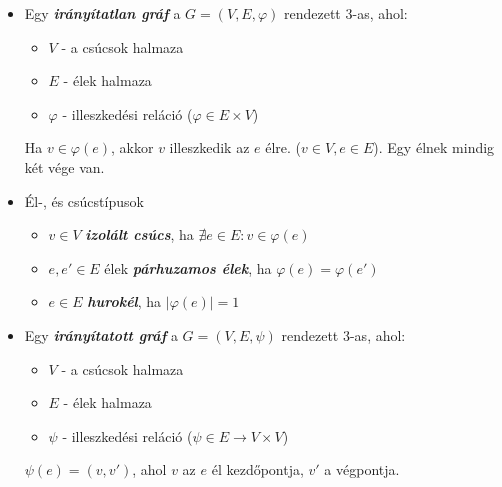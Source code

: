 \documentclass[12pt,margin=0px]{article}
\begin{document}
	\begin{itemize}[leftmargin=5.5mm]
        \renewcommand{\labelitemi}{$\vcenter{\hbox{\tiny$\bullet$}}$}
		\item Egy \emph{\textbf{irányítatlan gráf}} a $G = (V,E, \varphi)$ rendezett 3-as, ahol:
        \begin{itemize}[leftmargin=5.5mm]
            \renewcommand{\labelitemii}{$\vcenter{\hbox{\tiny$\triangleright$}}$}
            \item $V$ - a csúcsok halmaza
            \item $E$ - élek halmaza
            \item $\varphi$ - illeszkedési reláció ($\varphi \in E \times V$)
        \end{itemize}

        Ha $v\in\varphi(e)$, akkor $v$ illeszkedik az $e$ élre. ($v\in V, e\in E$). Egy élnek mindig két vége van.

        \item Él-, és csúcstípusok
        \begin{itemize}[leftmargin=5.5mm]
            \renewcommand{\labelitemii}{$\vcenter{\hbox{\tiny$\triangleright$}}$}
        	\item $v\in V$ \emph{\textbf{izolált csúcs}}, ha $\nexists e \in E: v\in \varphi(e)$
        	\item $e,e'\in E$ élek \emph{\textbf{párhuzamos élek}}, ha $\varphi(e) = \varphi(e')$
        	\item $e\in E$ \emph{\textbf{hurokél}}, ha $\big|\varphi(e) \big| = 1$
        \end{itemize}
        \item Egy \emph{\textbf{irányítatott gráf}} a $G = (V,E, \psi)$ rendezett 3-as, ahol:
        \begin{itemize}[leftmargin=5.5mm]
            \renewcommand{\labelitemii}{$\vcenter{\hbox{\tiny$\triangleright$}}$}
            \item $V$ - a csúcsok halmaza
            \item $E$ - élek halmaza
            \item $\psi$ - illeszkedési reláció ($\psi \in E \rightarrow V \times V$)
        \end{itemize}
        $\psi(e) = (v,v')$, ahol $v$ az $e$ él kezdőpontja, $v'$ a végpontja.
        \end{itemize}
\end{document}
